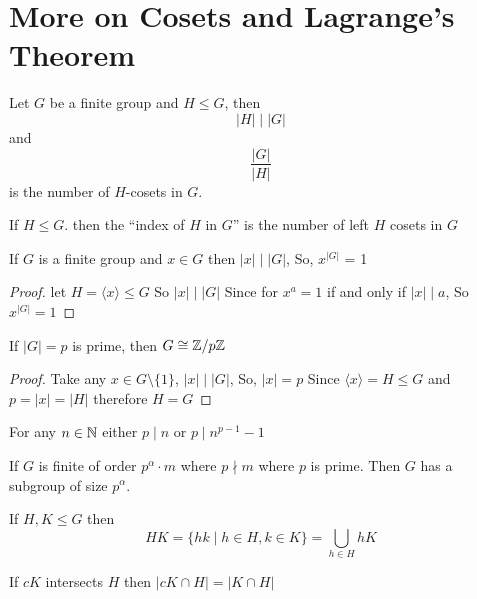 \section{More on Cosets and Lagrange's Theorem}

\begin{theorem}
  Let $G$ be a finite group and $H \le G$, then $$|H| \mid |G|$$  
  and $$\frac{|G|}{|H|}$$ is the number of $H$-cosets in $G$.
\end{theorem}

\begin{definition}
  If $H \le G$. then the ``index of $H$ in $G$'' is the number of 
  left $H$ cosets in $G$
\end{definition}

\begin{corollary}
  If $G$ is a finite group and $x \in G$ then $|x| \mid |G|$, So, $x^|G|$ = 1
\end{corollary}

\begin{proof}
  let $H = \langle x \rangle \le G$ So $|x| \mid |G|$
  Since for $x^a = 1$ if and only if $|x| \mid a$, So $x^{|G|} = 1$
\end{proof}

\begin{corollary}
  If $|G| = p$ is prime, then $G \cong \mathbb Z/p\mathbb Z$
\end{corollary}

\begin{proof}
  Take any $x \in G \setminus \{1\}$, $|x| \mid |G|$, So, $|x| = p$
  Since $\langle x \rangle = H \le G$ and $p = |x| = |H|$ therefore $H = G$
\end{proof}

\begin{theorem}
  For any $n \in \mathbb N$ either $p \mid n$ or $p \mid n^{p-1} -1$
\end{theorem}

\begin{theorem}[Sylow]
  If $G$ is finite of order $p^\alpha \cdot m$ where $p \nmid m$ where $p$ is prime.
  Then $G$ has a subgroup of size $p^\alpha$.
\end{theorem}

\begin{definition}
  If $H, K \le G$ then $$HK = \{hk \mid h \in H, k \in K\} = \bigcup_{h \in H} hK$$
\end{definition}

\begin{lemma}
  If $cK$ intersects $H$ then $|cK \cap H| = |K \cap H|$
\end{lemma}

